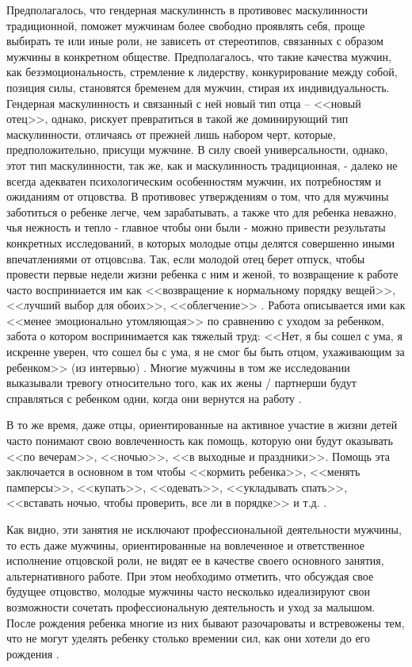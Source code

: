 \documentclass{../../common/thesisbyxetex}
\begin{document}
Предполагалось, что гендерная маскулиннсть
в противовес маскулинности традиционной, поможет мужчинам более свободно проявлять себя, проще
выбирать те или иные роли, не зависеть от стереотипов, связанных с образом мужчины в конкретном
обществе. Предполагалось, что такие качества мужчин, как безэмоциональность, стремление к
лидерству, конкурирование между собой, позиция силы, становятся бременем для мужчин,
стирая их индивидуальность. Гендерная маскулинность и связанный с ней новый тип отца -- <<новый
отец>>, однако, рискует превратиться в такой же доминирующий тип маскулинности, отличаясь от
прежней лишь набором черт, которые,  предположительно, присущи мужчине. В силу своей
универсальности, однако, этот тип маскулинности, так же, как и маскулинность традиционная, -
далеко не всегда адекватен психологическим особенностям мужчин, их  потребностям и ожиданиям
от отцовства.  В противовес утверждениям о том, что для мужчины заботиться о ребенке легче,
чем зарабатывать, а также что для ребенка неважно, чья нежность и тепло - главное чтобы они были -
можно привести результаты конкретных исследований, в которых молодые отцы делятся совершенно иными
впечатлениями от отцовсnва. Так, если молодой отец берет отпуск, чтобы провести первые
недели жизни ребенка с ним и женой, то возвращение к работе часто восприниается им как
<<возвращение к нормальному порядку вещей>>, <<лучший выбор для обоих>>, <<облегчение>>
\cite[370]{tri}. Работа описывается ими как <<менее эмоционально утомляющая>> по сравнению с
уходом за ребенком, забота о котором воспринимается как тяжелый труд: <<Нет, я бы сошел с ума, я
искренне уверен, что сошел бы с ума, я не смог бы быть отцом, ухаживающим за ребенком>> (из
интервью) \cite[370-371]{tri}. Многие мужчины в том же исследовании выказывали тревогу относительно
того, как их жены / партнерши будут справляться с ребенком одни, когда они вернутся на работу
\cite[370-371]{tri}.

В то же время, даже отцы, ориентированные на активное участие в жизни детей часто понимают свою
вовлеченность как помощь, которую они будут оказывать
<<по вечерам>>, <<ночью>>, <<в выходные и праздники>>. Помощь эта заключается в основном в том
чтобы <<кормить ребенка>>, <<менять памперсы>>, <<купать>>, <<одевать>>, <<укладывать спать>>,
<<вставать ночью, чтобы проверить, все ли в порядке>> и т.д. \cite[369]{tri}.

Как видно, эти занятия не исключают профессиональной деятельности мужчины, то есть даже мужчины,
ориентированные на вовлеченное и ответственное исполнение отцовской роли, не видят ее в качестве
своего основного занятия, альтернативного работе. При этом необходимо отметить, что обсуждая свое
будущее отцовство, молодые мужчины часто несколько идеализируют свои возможности сочетать
профессиональную деятельность и уход за малышом. После рождения ребенка многие из них бывают
разочароваты и встревожены тем, что не могут уделять ребенку столько времении сил, как они хотели
до его рождения \cite{tri}.
\end{document}

